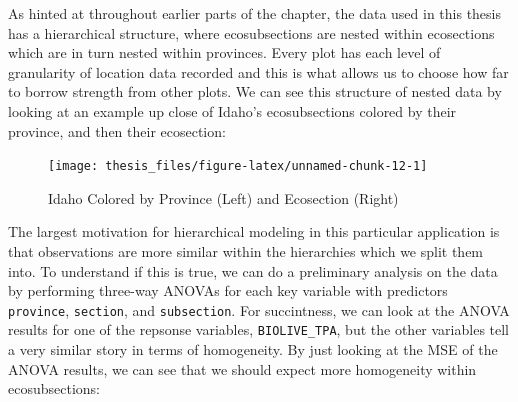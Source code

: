 \documentclass[12pt,twoside]{reedthesis}
\begin{document}
As hinted at throughout earlier parts of the chapter, the data used in this thesis has a hierarchical structure, where ecosubsections are nested within ecosections which are in turn nested within provinces. Every plot has each level of granularity of location data recorded and this is what allows us to choose how far to borrow strength from other plots. We can see this structure of nested data by looking at an example up close of Idaho's ecosubsections colored by their province, and then their ecosection:
\begin{figure}

{\centering \texttt{[image: thesis\_files/figure-latex/unnamed-chunk-12-1]} 

}

\caption{Idaho Colored by Province (Left) and Ecosection (Right)}\label{fig:unnamed-chunk-12}
\end{figure}
The largest motivation for hierarchical modeling in this particular application is that observations are more similar within the hierarchies which we split them into. To understand if this is true, we can do a preliminary analysis on the data by performing three-way ANOVAs for each key variable with predictors \texttt{province}, \texttt{section}, and \texttt{subsection}. For succintness, we can look at the ANOVA results for one of the repsonse variables, \texttt{BIOLIVE\_TPA}, but the other variables tell a very similar story in terms of homogeneity. By just looking at the MSE of the ANOVA results, we can see that we should expect more homogeneity within ecosubsections:
\end{document}
